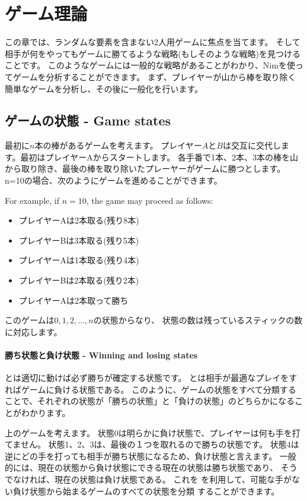 \chapter{ゲーム理論}

この章では、ランダムな要素を含まない2人用ゲームに焦点を当てます。
そして相手が何をやってもゲームに勝てるような戦略(もしそのような戦略)を見つけることです。
このようなゲームには一般的な戦略があることがわかり、Nimを使ってゲームを分析することができます。
まず、プレイヤーが山から棒を取り除く簡単なゲームを分析し、その後に一般化を行います。

\section{ゲームの状態 - Game states}

最初に$n$本の棒があるゲームを考えます。
プレイヤー$A$と$B$は交互に交代します。最初はプレイヤーAからスタートします。
各手番で1本、2本、3本の棒を山から取り除き、最後の棒を取り除いたプレーヤーがゲームに勝つとします。
n=10の場合、次のようにゲームを進めることができます。

For example, if $n=10$, the game may proceed as follows:
\begin{itemize}[noitemsep]
\item プレイヤーAは2本取る(残り8本)
\item プレイヤーBは3本取る(残り5本)
\item プレイヤーAは1本取る(残り4本)
\item プレイヤーBは2本取る(残り2本)
\item プレイヤーAは2本取って勝ち
\end{itemize}

このゲームは$0,1,2,\ldots,n$の状態からなり、
状態の数は残っているスティックの数に対応します。

\subsubsection{勝ち状態と負け状態 - Winning and losing states}


 とは適切に動けば必ず勝ちが確定する状態です。
 とは相手が最適なプレイをすればゲームに負ける状態である。
このように、ゲームの状態をすべて分類することで、それぞれの状態が「勝ちの状態」と「負けの状態」のどちらかになることがわかります。

上のゲームを考えます。
状態0は明らかに負け状態で、プレイヤーは何も手を打てません。
状態1、2、3は、最後の１つを取れるので勝ちの状態です。
状態4は逆にどの手を打っても相手が勝ち状態になるため、負け状態と言えます。
一般的には、現在の状態から負け状態にできる現在の状態は勝ち状態であり、
そうでなければ、現在の状態は負け状態である。
これを を利用して、可能な手がない負け状態から始まるゲームのすべての状態を分類 することができます。

